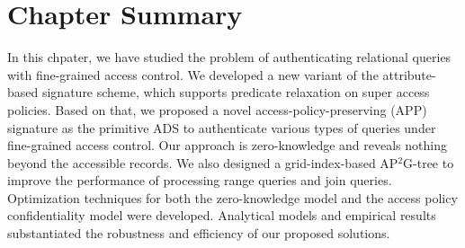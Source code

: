 \section{Chapter Summary}\label{sec:access-control:summary}
In this chpater, we have studied the problem of authenticating relational queries with fine-grained access control. We developed a new variant of the attribute-based signature scheme, which supports predicate relaxation on super access policies. Based on that, we proposed a novel access-policy-preserving (APP) signature as the primitive ADS to authenticate various types of queries under fine-grained access control. Our approach is zero-knowledge and reveals nothing beyond the accessible records. We also designed a grid-index-based AP$^2$G-tree to improve the performance of processing range queries and join queries. Optimization techniques for both the zero-knowledge model and the access policy confidentiality model were developed. Analytical models and empirical results substantiated the robustness and efficiency of our proposed solutions.
